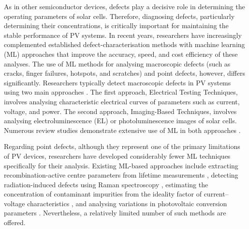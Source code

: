\documentclass[10pt]{iopart}
\begin{document}
As in other semiconductor devices, defects play a decisive role in determining the operating parameters of solar cells.
Therefore, diagnosing defects, particularly determining their concentrations, is critically important for maintaining the stable performance of PV systems.
In recent years, researchers have increasingly complemented established defect-characterisation methods with machine learning (ML) approaches that improve the accuracy, speed, and cost efficiency of these analyses.
The use of ML methods for analysing macroscopic defects (such as cracks, finger failures, hotspots, and scratches) and point defects, however, differs significantly.
Researchers typically detect macroscopic defects in PV systems using two main approaches \cite{Jia2024, Hijjawi2023}.
The first approach, Electrical Testing Techniques, involves analysing characteristic electrical curves of parameters such as current, voltage, and power.
The second approach, Imaging-Based Techniques, involves analysing electroluminescence (EL) \cite{Liu2024a} or photoluminescence \cite{Doll2021} images of solar cells.
Numerous review studies demonstrate extensive use of ML in both approaches \cite{Datta2023, Jaiswal2023, Buratti2024, MAHDAVIPOUR, Hopwood2020, Li2021, Liu2021}.

Regarding point defects, although they represent one of the primary limitations of PV devices, researchers have developed considerably fewer ML techniques specifically for their analysis.
Existing ML-based approaches include extracting recombination-active centre parameters from lifetime measurements \cite{Wang2024a, Buratti2022, Buratti2020a},
detecting radiation-induced defects using Raman spectroscopy \cite{Park2022, Chia2024}, 
estimating the concentration of contaminant impurities from the ideality factor of current–voltage characteristics \cite{Olikh2022PPV}, 
and analysing variations in photovoltaic conversion parameters \cite{Olikh2025SE}.
Nevertheless, a relatively limited number of such methods are offered.
\end{document}
